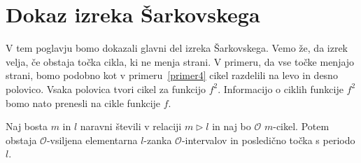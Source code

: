 \documentclass[mat2]{fmfdelo}
\begin{document}
\section{Dokaz izreka Šarkovskega}
V tem poglavju bomo dokazali glavni del izreka Šarkovskega. Vemo že, da izrek velja, če obstaja točka cikla, ki ne menja strani. V primeru, da vse točke menjajo strani, bomo podobno kot v primeru~\ref{primer4} cikel razdelili na levo in desno polovico. Vsaka polovica tvori cikel za funkcijo $f^2$. Informacijo o ciklih funkcije $f^2$ bomo nato prenesli na cikle funkcije $f$.

\begin{trditev}\label{trd:realcvtm}
Naj bosta $m$ in $l$ naravni števili v relaciji $m \triangleright l$ in naj bo $\mathcal{O}$ $m$-cikel. Potem obstaja $\mathcal{O}$-vsiljena elementarna $l$-zanka $\mathcal{O}$-intervalov in posledično točka s periodo $l$.
\end{trditev}
\end{document}
